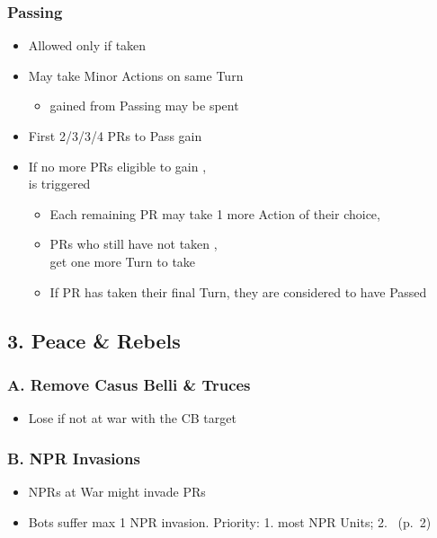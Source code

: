 \documentclass[10pt]{article}
\begin{document}
\subsubsection*{Passing}
\begin{itemize}
	\item Allowed only if  taken
	\item May take Minor Actions on same Turn
	\begin{itemize}
		\item \ducats gained from Passing may be spent
	\end{itemize}
	\item First 2/3/3/4 PRs to Pass gain \ducats
	\item If no more PRs eligible to gain \ducats,\\  is triggered
	\begin{itemize}
		\item Each remaining PR may take 1 more Action of their choice, 
		\item PRs who still have not taken ,\\ get one more Turn to take 
		\item If PR has taken their final Turn, they are considered to have Passed
	\end{itemize}
\end{itemize}

\subsection*{3. Peace \& Rebels}
\subsubsection*{A. Remove Casus Belli \& Truces}
\begin{itemize}
	\item Lose  if not at war with the CB target
\end{itemize}

\subsubsection*{B. NPR Invasions }
\begin{itemize}
	\item {}NPRs at War might invade PRs
	\botrules
	\item Bots suffer max 1 NPR invasion. Priority: 1. most NPR Units; 2. \az~(p.~2)
\end{itemize}
\end{document}
